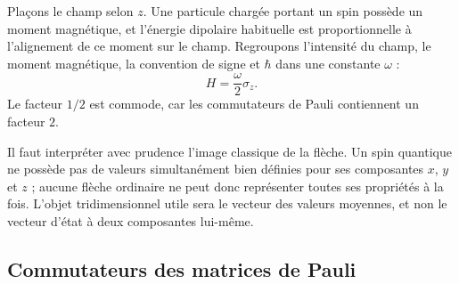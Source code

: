 Plaçons le champ selon \(z\). Une particule chargée portant un spin possède un moment magnétique, et l’énergie dipolaire habituelle est proportionnelle à l’alignement de ce moment sur le champ. Regroupons l’intensité du champ, le moment magnétique, la convention de signe et \(\hbar\) dans une constante \(\omega\) :
\begin{equation}
H=\frac{\omega}{2}\sigma_z.
\label{eq:l5-z-hamiltonian}
\end{equation}
Le facteur \(1/2\) est commode, car les commutateurs de Pauli contiennent un facteur \(2\).

Il faut interpréter avec prudence l’image classique de la flèche. Un spin quantique ne possède pas de valeurs simultanément bien définies pour ses composantes \(x\), \(y\) et \(z\) ; aucune flèche ordinaire ne peut donc représenter toutes ses propriétés à la fois. L’objet tridimensionnel utile sera le vecteur des valeurs moyennes, et non le vecteur d’état à deux composantes lui-même.

\subsection{Commutateurs des matrices de Pauli}

